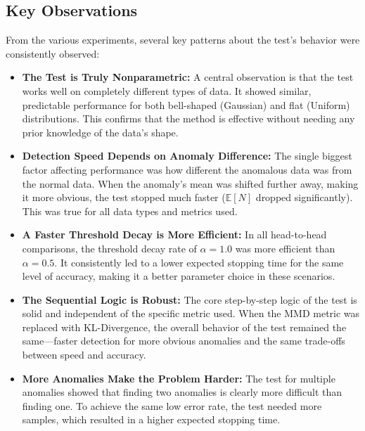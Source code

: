 \subsection{Key Observations}
From the various experiments, several key patterns about the test's behavior were consistently observed:
\begin{itemize}
    \item \textbf{The Test is Truly Nonparametric:} A central observation is that the test works well on completely different types of data. It showed similar, predictable performance for both bell-shaped (Gaussian) and flat (Uniform) distributions. This confirms that the method is effective without needing any prior knowledge of the data's shape.

    \item \textbf{Detection Speed Depends on Anomaly Difference:} The single biggest factor affecting performance was how different the anomalous data was from the normal data. When the anomaly's mean was shifted further away, making it more obvious, the test stopped much faster ($\mathbb{E}[N]$ dropped significantly). This was true for all data types and metrics used.

    \item \textbf{A Faster Threshold Decay is More Efficient:} In all head-to-head comparisons, the threshold decay rate of $\alpha=1.0$ was more efficient than $\alpha=0.5$. It consistently led to a lower expected stopping time for the same level of accuracy, making it a better parameter choice in these scenarios.

    \item \textbf{The Sequential Logic is Robust:} The core step-by-step logic of the test is solid and independent of the specific metric used. When the MMD metric was replaced with KL-Divergence, the overall behavior of the test remained the same—faster detection for more obvious anomalies and the same trade-offs between speed and accuracy.

    \item \textbf{More Anomalies Make the Problem Harder:} The test for multiple anomalies showed that finding two anomalies is clearly more difficult than finding one. To achieve the same low error rate, the test needed more samples, which resulted in a higher expected stopping time.
\end{itemize}

